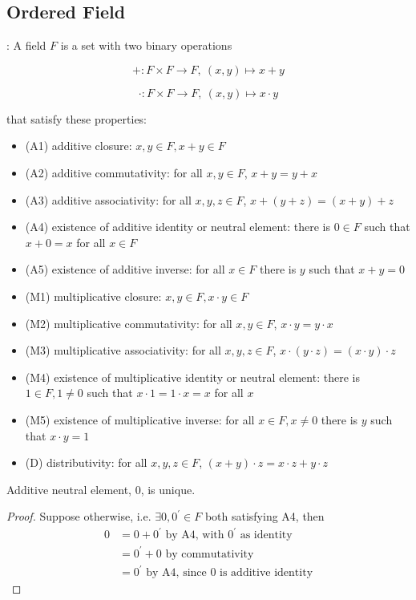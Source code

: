 \subsection{Ordered Field}
\begin{definition}[Field]: 
  A field $F$ is a set with two binary operations

\[
+: F \times F \to F,\ (x, y) \mapsto x + y
\]

\[
\cdot: F \times F \to F,\ (x, y) \mapsto x \cdot y
\]

that satisfy these properties:
\begin{itemize}
\item (A1) additive closure: $x, y \in F, x + y \in F$
\item (A2) additive commutativity: for all $x, y \in F$, $x + y = y + x$
\item (A3) additive associativity: for all $x, y, z \in F$, $x + (y + z) = (x + y) + z$
\item (A4) existence of additive identity or neutral element: there is $0 \in F$ such that $x + 0 = x$ for all $x \in F$
\item (A5) existence of additive inverse: for all $x \in F$ there is $y$ such that $x + y = 0$
\item (M1) multiplicative closure: $x, y \in F, x \cdot y \in F$
\item (M2) multiplicative commutativity: for all $x, y \in F$, $x \cdot y = y \cdot x$
\item (M3) multiplicative associativity: for all $x, y, z \in F$, $x \cdot (y \cdot z) = (x \cdot y) \cdot z$
\item (M4) existence of multiplicative identity or neutral element: there is $1 \in F, 1 \neq 0$ such that $x \cdot 1 = 1 \cdot x = x$ for all $x$
\item (M5) existence of multiplicative inverse: for all $x \in F, x \neq 0$ there is $y$ such that $x \cdot y = 1$
\item (D) distributivity: for all $x, y, z \in F$, $(x + y) \cdot z = x \cdot z + y \cdot z$
\end{itemize}
\end{definition}

\begin{remark} Additive neutral element, 0, is unique.
\end{remark}
\begin{proof} Suppose otherwise, i.e. $\exists 0, 0^{\prime} \in F$ both satisfying A4, then 
  \begin{align*}
      0 &= 0 + 0^{\prime} \text{ by A4, with $0^{\prime}$ as identity} \\
      &= 0^{\prime} + 0 \text{ by commutativity} \\
      &= 0^{\prime} \text{ by A4, since 0 is additive identity}
  \end{align*}
\end{proof}

